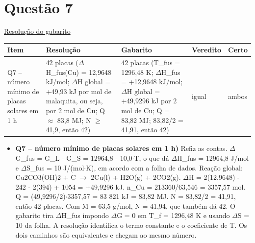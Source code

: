 \documentclass{article}%
\begin{document}
\section*{Questão 7}%
\href{https://poliedroresolve.sistemapoliedro.com.br/vestibulares/ime/2026/ime-2-fase-dia-3-25-10-2025-2-fase-dia-3/dissertativa-7-quimica-2-fase-dia-3-ime-2026}{Resolução do gabarito}\par\smallskip%
\begin{longtable}{@{}p{} p{} p{} p{} p{}@{}}\toprule Item & Resolução & Gabarito & Veredito & Certo \\ \midrule
Q7 -- número mínimo de placas solares em 1 h & 42 placas ($\Delta$H\_fus(Cu) = 12,9648 kJ/mol; $\Delta$H global = +49,93 kJ por mol de malaquita, ou seja, por 2 mol de Cu; Q $\approx$ 83,8 MJ; N $\geq$ 41,9, então 42) & 42 placas (T\_fus = 1296,48 K; $\Delta$H\_fus = +12,9648 kJ/mol; $\Delta$H global = +49,9296 kJ por 2 mol de Cu; Q = 83,82 MJ; 83,82/2 = 41,91, então 42) & igual & ambos \\
\bottomrule\end{longtable}%
\begin{itemize}%
\item%
\textbf{Q7 -- número mínimo de placas solares em 1 h)} Refiz as contas. $\Delta$G\_fus = G\_L - G\_S = 12964,8 - 10,0$\cdot$T, o que dá $\Delta$H\_fus = 12964,8 J/mol e $\Delta$S\_fus = 10 J/(mol$\cdot$K), em acordo com a folha de dados. Reação global: Cu2CO3(OH)2 + C $\to$ 2Cu(l) + H2O(g) + 2CO2(g). $\Delta$H = 2(12,9648) - 242 - 2(394) + 1054 = +49,9296 kJ. n\_Cu = 213360/63,546 = 3357,57 mol. Q = (49,9296/2)$\cdot$3357,57 = 83 821 kJ = 83,82 MJ. N = 83,82/2 = 41,91, então 42 placas. Com M = 63,5 g/mol, N = 41,94, que também dá 42. O gabarito tira $\Delta$H\_fus impondo $\Delta$G = 0 em T\_f = 1296,48 K e usando $\Delta$S = 10 da folha. A resolução identifica o termo constante e o coeficiente de T. Os dois caminhos são equivalentes e chegam ao mesmo número.%
\end{itemize}%
\end{document}
